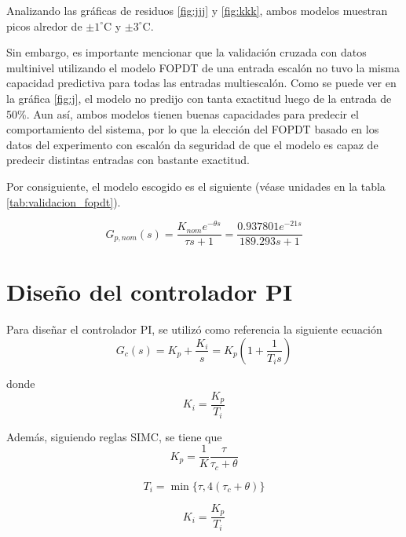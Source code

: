 \documentclass[journal]{IEEEtran}
\begin{document}
Analizando las gráficas de residuos \ref{fig:jjj} y \ref{fig:kkk}, ambos modelos muestran picos alredor de $\pm1^\circ\text{C}$ y $\pm3^\circ\text{C}$.

Sin embargo, es importante mencionar que la validación cruzada con datos multinivel utilizando el modelo FOPDT de una entrada escalón no tuvo la misma capacidad predictiva para todas las entradas multiescalón. Como se puede ver en la gráfica \ref{fig:j}, el modelo no predijo con tanta exactitud luego de la entrada de 50\%. Aun así, ambos modelos tienen buenas capacidades para predecir el comportamiento del sistema, por lo que la elección del FOPDT basado en los datos 
del experimento con escalón da seguridad de que el modelo es capaz de predecir distintas entradas con bastante exactitud. 

Por consiguiente, el modelo escogido es el siguiente (véase unidades en la tabla \ref{tab:validacion_fopdt}).

\begin{equation}
        G_{p,nom}(s)=\frac{K_{nom}e^{-\theta s}}{\tau s + 1}=\frac{0.937801e^{-21s}}{189.293s+1}
\end{equation}

\section{Diseño del controlador PI}
Para diseñar el controlador PI, se utilizó como referencia la siguiente ecuación
\begin{equation}
        G_{c}(s)=K_p+\frac{K_i}{s}=K_p\left(1+\frac{1}{T_i s}\right)
\end{equation}

donde
\begin{equation}
        K_i=\frac{K_p}{T_i}
\end{equation}

Además, siguiendo reglas SIMC, se tiene que
\begin{equation}
        K_p=\frac{1}{K}\frac{\tau}{\tau_c+\theta}
\end{equation}

\begin{equation}
        T_i=\min\{\tau,4(\tau_c+\theta)\}
\end{equation}

\begin{equation}
        K_i=\frac{K_p}{T_i}
\end{equation}
\end{document}

